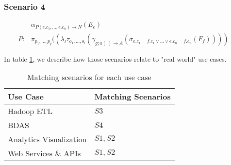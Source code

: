 \subsubsection{Scenario 4}

\begin{align}
& \alpha_{P(e.c_1, \dots, e.c_n) \rightarrow N}(E_e) \\
P : & \pi_{p_1,\dots,p_q}((\lambda_l\tau_{o_1,\dots,o_l}(\gamma_{g;a(.) \rightarrow A}(\sigma_{e.c_1 = f.c_1 \vee \dots \vee e.c_n = f.c_n}(F_f))))& \nonumber
\end{align}

In table \ref{tab:matching}, we describe how those scenarios relate to "real world" use cases.


\begin{table}[]
\centering
\caption{Matching scenarios for each use case}
\label{tab:matching}
\begin{tabular}{|l|l|}
\hline
Use Case               & Matching Scenarios    \\ \hline
Hadoop ETL              & $S3$ \\ \hline
BDAS                    & $S4$ \\ \hline
Analytics Visualization & $S1, S2$ \\ \hline
Web Services \& APIs    & $S1, S2$ \\ \hline
\end{tabular}
\end{table}
